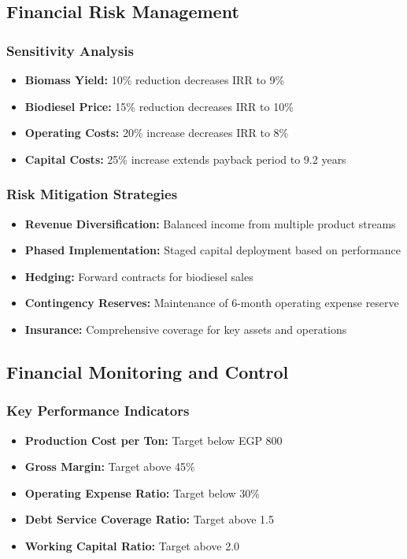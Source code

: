 \subsection{Financial Risk Management}

\subsubsection{Sensitivity Analysis}
\begin{itemize}
    \item \textbf{Biomass Yield:} 10\% reduction decreases IRR to 9\%
    \item \textbf{Biodiesel Price:} 15\% reduction decreases IRR to 10\%
    \item \textbf{Operating Costs:} 20\% increase decreases IRR to 8\%
    \item \textbf{Capital Costs:} 25\% increase extends payback period to 9.2 years
\end{itemize}

\subsubsection{Risk Mitigation Strategies}
\begin{itemize}
    \item \textbf{Revenue Diversification:} Balanced income from multiple product streams
    \item \textbf{Phased Implementation:} Staged capital deployment based on performance
    \item \textbf{Hedging:} Forward contracts for biodiesel sales
    \item \textbf{Contingency Reserves:} Maintenance of 6-month operating expense reserve
    \item \textbf{Insurance:} Comprehensive coverage for key assets and operations
\end{itemize}

\subsection{Financial Monitoring and Control}

\subsubsection{Key Performance Indicators}
\begin{itemize}
    \item \textbf{Production Cost per Ton:} Target below EGP 800
    \item \textbf{Gross Margin:} Target above 45\%
    \item \textbf{Operating Expense Ratio:} Target below 30\%
    \item \textbf{Debt Service Coverage Ratio:} Target above 1.5
    \item \textbf{Working Capital Ratio:} Target above 2.0
\end{itemize}

